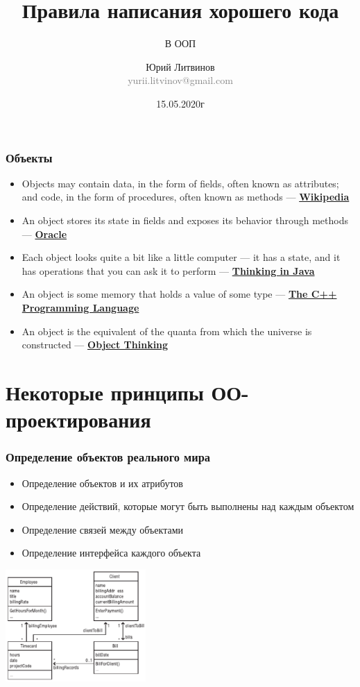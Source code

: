 \documentclass[xetex,mathserif,serif]{beamer}
\title{Правила написания хорошего кода}
\subtitle{В ООП}
\author[Юрий Литвинов]{Юрий Литвинов\\\small{\textcolor{gray}{yurii.litvinov@gmail.com}}}
\date{15.05.2020г}
\begin{document}
	\frame{\titlepage}

	\begin{frame}
		\frametitle{Объекты}
		\begin{itemize}
			\item Objects may contain data, in the form of fields, often known as attributes; and code, in the form of procedures, often known as methods --- \textbf{\href{https://en.wikipedia.org/wiki/Object-oriented\_programming}{Wikipedia}}
			\item An object stores its state in fields and exposes its behavior through methods --- \textbf{\href{https://docs.oracle.com/javase/tutorial/java/concepts/object.html}{Oracle}}
			\item Each object looks quite a bit like a little computer --- it has a state, and it has operations that you can ask it to perform --- \textbf{\href{http://amzn.to/1PBmQpm}{Thinking in Java}}
			\item An object is some memory that holds a value of some type --- \textbf{\href{http://amzn.to/1XyGCtk}{The C++ Programming Language}}
			\item An object is the equivalent of the quanta from which the universe is constructed --- \textbf{\href{http://amzn.to/266oJr4}{Object Thinking}}
		\end{itemize}
	\end{frame}

	\section{Некоторые принципы ОО-проектирования}

	\begin{frame}
		\frametitle{Определение объектов реального мира}
		\begin{itemize}
			\item Определение объектов и их атрибутов
			\item Определение действий, которые могут быть выполнены над каждым объектом
			\item Определение связей между объектами
			\item Определение интерфейса каждого объекта
		\end{itemize}
		\begin{center}
			\includegraphics[width=0.4\textwidth]{billDomainModel.png}
		\end{center}
	\end{frame}
\end{document}
